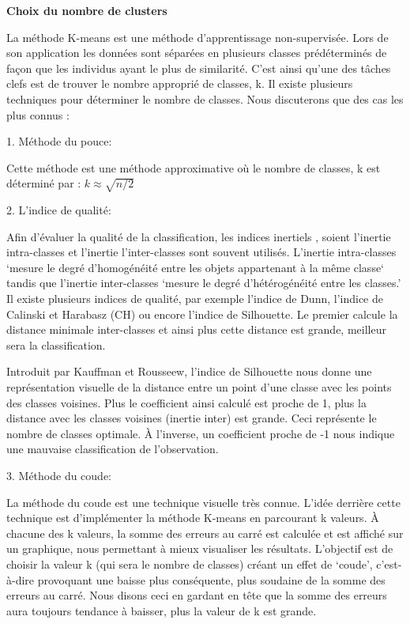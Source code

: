\documentclass[ ]{article}
\begin{document}
\vspace{30 mm}
\noindent
\begin{large}
\textbf{Choix du nombre de clusters}
\end{large}
\vspace{5 mm}

\noindent
La méthode K-means est une méthode d'apprentissage non-supervisée. Lors de son application les données sont séparées en plusieurs classes prédéterminés de façon que les individus ayant le plus de similarité. C’est ainsi qu’une des tâches clefs est de trouver le nombre approprié de classes, k. Il existe plusieurs techniques pour déterminer le nombre de classes. Nous discuterons que des cas les plus connus : 
\begin{description}
  \item 1. Méthode du pouce:
  
  Cette méthode est une méthode approximative où le nombre de classes, k est déterminé par : 
$ k \approx \sqrt{n/2}$

    \item 2. L'indice de qualité:
    
	Afin d’évaluer la qualité de la classification, les indices inertiels , soient l’inertie intra-classes et l’inertie l’inter-classes sont souvent utilisés. L’inertie intra-classes ‘mesure le degré d’homogénéité entre les objets appartenant à la même classe‘ tandis que l’inertie inter-classes ‘mesure le degré d’hétérogénéité entre les classes.’
Il existe plusieurs indices de qualité, par exemple l’indice de Dunn, l’indice de Calinski et Harabasz (CH) ou encore l’indice de Silhouette. 
Le premier calcule la distance minimale inter-classes et ainsi plus cette distance est grande, meilleur sera la classification. 

Introduit par Kauffman et Rousseew, l’indice de Silhouette nous donne une représentation visuelle de la distance entre un point d’une classe avec les points des classes voisines. Plus le coefficient ainsi calculé est proche de 1, plus la distance avec les classes voisines (inertie inter) est grande. Ceci représente le nombre de classes optimale. À l’inverse, un coefficient proche de -1 nous indique une mauvaise classification de l’observation.


		\item 3. Méthode du coude:
		
  La méthode du coude est une technique visuelle très connue. L’idée derrière cette technique est d’implémenter la méthode K-means en parcourant k valeurs. À chacune des k valeurs, la somme des erreurs au carré est calculée et est affiché sur un graphique, nous permettant à mieux visualiser les résultats. L’objectif est de choisir la valeur k (qui sera le nombre de classes) créant un effet de ‘coude’, c’est-à-dire provoquant une baisse plus conséquente, plus soudaine de la somme des erreurs au carré. Nous disons ceci en gardant en tête que la somme des erreurs aura toujours tendance à baisser, plus la valeur de k est grande. 
  

\end{description}
\end{document}
